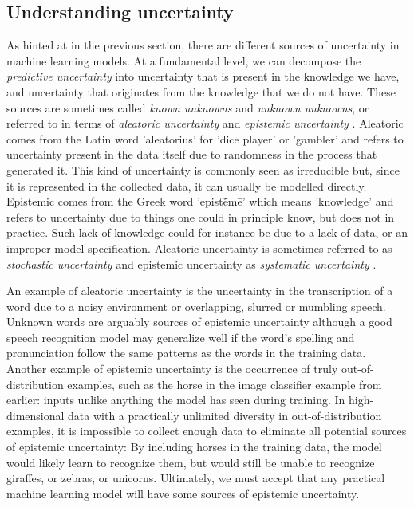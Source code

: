 \subsection{Understanding uncertainty} \label{subsec:understanding-uncertainty}
% 
% 
As hinted at in the previous section, there are different sources of uncertainty in machine learning models. 
At a fundamental level, we can decompose the \textit{predictive uncertainty} into uncertainty that is present in the knowledge we have, and uncertainty that originates from the knowledge that we do not have.
These sources are sometimes called \emph{known unknowns} and \emph{unknown unknowns}, or referred to in terms of \textit{aleatoric uncertainty} and \textit{epistemic uncertainty} \parencite{kendall_what_2017}. 
Aleatoric comes from the Latin word 'aleatorius' for 'dice player' or 'gambler' and refers to uncertainty present in the data itself due to randomness in the process that generated it. This kind of uncertainty is commonly seen as irreducible but, since it is represented in the collected data, it can usually be modelled directly. 
Epistemic comes from the Greek word 'epistḗmē' which means 'knowledge' and refers to uncertainty due to things one could in principle know, but does not in practice. Such lack of knowledge could for instance be due to a lack of data, or an improper model specification. 
Aleatoric uncertainty is sometimes referred to as \textit{stochastic uncertainty} and epistemic uncertainty as \textit{systematic uncertainty} \parencite{kendall_what_2017}. 

An example of aleatoric uncertainty is the uncertainty in the transcription of a word due to a noisy environment or overlapping, slurred or mumbling speech. 
Unknown words are arguably sources of epistemic uncertainty although a good speech recognition model may generalize well if the word's spelling and pronunciation follow the same patterns as the words in the training data. Another example of epistemic uncertainty is the occurrence of truly out-of-distribution examples, such as the horse in the image classifier example from earlier: inputs unlike anything the model has seen during training. %
In high-dimensional data with a practically unlimited diversity in out-of-distribution examples, it is impossible to collect enough data to eliminate all potential sources of epistemic uncertainty: By including horses in the training data, the model would likely learn to recognize them, but would still be unable to recognize giraffes, or zebras, or unicorns. 
Ultimately, we must accept that any practical machine learning model will have some sources of epistemic uncertainty. 


